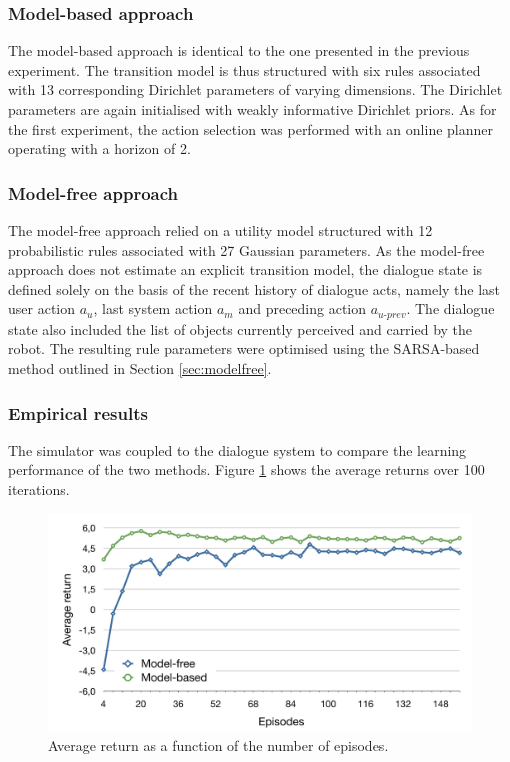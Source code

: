 \subsubsection*{Model-based approach}

The model-based approach is identical to the one presented in the previous experiment. The transition model is thus structured with six rules associated with 13 corresponding Dirichlet parameters of varying dimensions.   The Dirichlet parameters are again initialised with weakly informative Dirichlet priors.  As for the first experiment, the action selection was performed with an online planner operating with a horizon of 2. 

\subsubsection*{Model-free approach}

The model-free approach relied on a utility model structured with 12 probabilistic rules associated with 27 Gaussian parameters. As the model-free approach does not estimate an explicit transition model, the dialogue state is defined solely on the basis of the recent history of dialogue acts, namely the last user action $a_u$, last system action $a_m$ and preceding action $a_{u\mbox{-}prev}$. The dialogue state also included the list of objects currently perceived and carried by the robot. The resulting rule parameters were optimised using the SARSA-based method outlined in Section \ref{sec:modelfree}. 

\subsubsection*{Empirical results}

The simulator was coupled to the dialogue system to compare the learning performance of the two methods.  Figure \ref{fig:return_episodes} shows the average returns over 100 iterations.

\begin{figure}[p]
\centering
\includegraphics[scale=0.42]{imgs/episodes.pdf}
\caption{Average return as a function of the number of episodes.}
\label{fig:return_episodes}
\end{figure}


